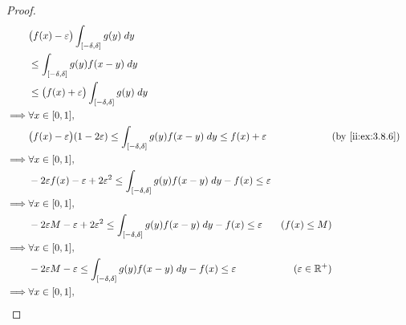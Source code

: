 \begin{proof}
\begin{align*}
             & \big(f(x) - \varepsilon\big) \int_{[-\delta, \delta]} g(y) \; dy                                                                                                                \\
             & \leq \int_{[-\delta, \delta]} g(y) f(x - y) \; dy                                                                                                                               \\
             & \leq \big(f(x) + \varepsilon\big) \int_{[-\delta, \delta]} g(y) \; dy                                                                                                           \\
    \implies & \forall x \in [0, 1],                                                                                                                                                           \\
             & \big(f(x) - \varepsilon\big) (1 - 2 \varepsilon) \leq \int_{[-\delta, \delta]} g(y) f(x - y) \; dy \leq f(x) + \varepsilon    &                        & \by{ii:ex:3.8.6}       \\
    \implies & \forall x \in [0, 1],                                                                                                                                                           \\
             & -2 \varepsilon f(x) - \varepsilon + 2 \varepsilon^2 \leq \int_{[-\delta, \delta]} g(y) f(x - y) \; dy - f(x) \leq \varepsilon                                                   \\
    \implies & \forall x \in [0, 1],                                                                                                                                                           \\
             & -2 \varepsilon M - \varepsilon + 2 \varepsilon^2 \leq \int_{[-\delta, \delta]} g(y) f(x - y) \; dy - f(x) \leq \varepsilon    & (f(x) \leq M)                                   \\
    \implies & \forall x \in [0, 1],                                                                                                                                                           \\
             & -2 \varepsilon M - \varepsilon \leq \int_{[-\delta, \delta]} g(y) f(x - y) \; dy - f(x) \leq \varepsilon                      & (\varepsilon \in \R^+)                          \\
    \implies & \forall x \in [0, 1],                                                                                                                                                           \\

\end{align*}
\end{proof}
